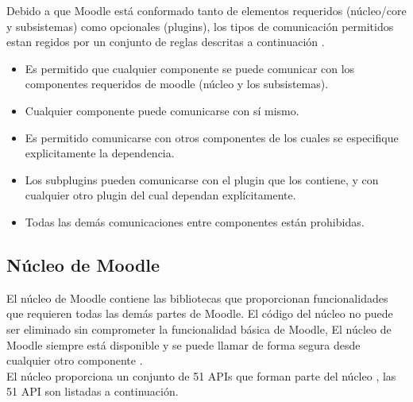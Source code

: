     
    
 \noindent Debido a que Moodle está conformado tanto de elementos requeridos (núcleo/core y subsistemas)
 como opcionales (plugins), los tipos de comunicación permitidos estan regidos por un conjunto de reglas
 descritas a continuación \cite{moodleComponets}.

    
    \begin{itemize}
        \item{ Es permitido que cualquier componente se puede comunicar con los componentes requeridos de moodle (núcleo y los subsistemas). }
        \item{ Cualquier componente puede comunicarse con sí mismo. }
        \item{ Es permitido comunicarse con otros componentes de los cuales se especifique explicitamente la dependencia. }
        \item{ Los subplugins pueden comunicarse con el plugin que los contiene, y con cualquier otro plugin del cual dependan explícitamente.}
        \item{ Todas las demás comunicaciones entre componentes están prohibidas.}
    \end{itemize}
    
\subsection{Núcleo de Moodle}
El núcleo de Moodle contiene las bibliotecas que proporcionan funcionalidades que requieren todas las demás partes de Moodle. El código del núcleo no puede ser eliminado sin comprometer la funcionalidad básica de Moodle, El núcleo de Moodle siempre está disponible y se puede llamar de forma segura desde cualquier otro componente \cite{moodleComponets}. \\

\noindent El núcleo proporciona un conjunto de 51 APIs que forman parte del núcleo \cite{moodleCoreAPIs}, las 51 API son listadas a continuación.

 \begin{multicols}{3}
    
 \end{multicols}
